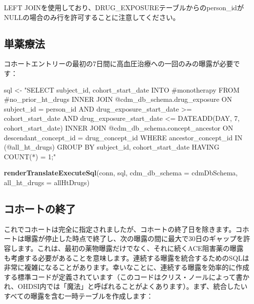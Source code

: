 \documentclass[
  11pt]{book}
\newenvironment{Shaded}{\begin{snugshade}}{\end{snugshade}}
\newcommand{\AttributeTok}[1]{\textcolor[rgb]{0.13,0.29,0.53}{#1}}
\newcommand{\FunctionTok}[1]{\textcolor[rgb]{0.13,0.29,0.53}{\textbf{#1}}}
\newcommand{\NormalTok}[1]{#1}
\newcommand{\OtherTok}[1]{\textcolor[rgb]{0.56,0.35,0.01}{#1}}
\newcommand{\StringTok}[1]{\textcolor[rgb]{0.31,0.60,0.02}{#1}}
\theoremstyle{definition}
\theoremstyle{definition}
\theoremstyle{definition}
\theoremstyle{definition}
\theoremstyle{remark}
\begin{document}
LEFT JOINを使用しており、DRUG\_EXPOSUREテーブルからのperson\_idがNULLの場合のみ行を許可することに注意してください。

\subsection{単薬療法}\label{ux5358ux85acux7642ux6cd5}

コホートエントリーの最初の7日間に高血圧治療への一回のみの曝露が必要です：

\begin{Shaded}
\begin{Highlighting}[]
\NormalTok{sql }\OtherTok{\textless{}{-}} \StringTok{"SELECT subject\_id,}
\StringTok{  cohort\_start\_date}
\StringTok{INTO \#monotherapy}
\StringTok{FROM \#no\_prior\_ht\_drugs}
\StringTok{INNER JOIN @cdm\_db\_schema.drug\_exposure}
\StringTok{  ON subject\_id = person\_id}
\StringTok{    AND drug\_exposure\_start\_date \textgreater{}= cohort\_start\_date}
\StringTok{    AND drug\_exposure\_start\_date \textless{}= DATEADD(DAY, 7, cohort\_start\_date)}
\StringTok{INNER JOIN @cdm\_db\_schema.concept\_ancestor}
\StringTok{  ON descendant\_concept\_id = drug\_concept\_id}
\StringTok{WHERE ancestor\_concept\_id IN (@all\_ht\_drugs)}
\StringTok{GROUP BY subject\_id,}
\StringTok{  cohort\_start\_date}
\StringTok{HAVING COUNT(*) = 1;"}

\FunctionTok{renderTranslateExecuteSql}\NormalTok{(conn,}
\NormalTok{                          sql,}
                          \AttributeTok{cdm\_db\_schema =}\NormalTok{ cdmDbSchema,}
                          \AttributeTok{all\_ht\_drugs =}\NormalTok{ allHtDrugs)}
\end{Highlighting}
\end{Shaded}

\subsection{コホートの終了}\label{ux30b3ux30dbux30fcux30c8ux306eux7d42ux4e86}

これでコホートは完全に指定されましたが、コホートの終了日を除きます。コホートは曝露が停止した時点で終了し、次の曝露の間に最大で30日のギャップを許容します。これは、最初の薬物曝露だけでなく、それに続くACE阻害薬の曝露も考慮する必要があることを意味します。連続する曝露を統合するためのSQLは非常に複雑になることがあります。幸いなことに、連続する曝露を効率的に作成する標準コードが定義されています（このコードはクリス・ノールによって書かれ、OHDSI内では「魔法」と呼ばれることがよくあります）。まず、統合したいすべての曝露を含む一時テーブルを作成します：
\end{document}
